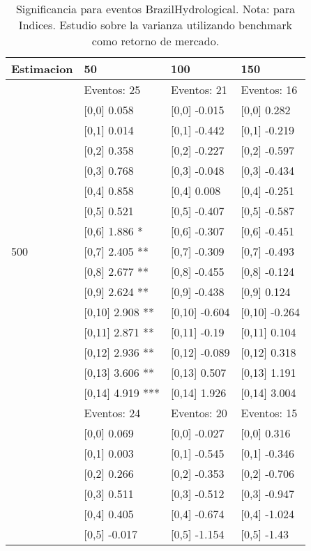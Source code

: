 \begin{table}

\caption{Significancia para eventos BrazilHydrological. Nota: para Indices. Estudio sobre la varianza utilizando benchmark como retorno de mercado.}
\centering
\begin{tabular}[t]{llll}
\toprule
Estimacion & 50 & 100 & 150\\
\midrule
 & Eventos:  25 & Eventos:  21 & Eventos:  16\\
 & {}[0,0] 0.058 & {}[0,0] -0.015 & {}[0,0] 0.282\\
 & {}[0,1] 0.014 & {}[0,1] -0.442 & {}[0,1] -0.219\\
 & {}[0,2] 0.358 & {}[0,2] -0.227 & {}[0,2] -0.597\\
 & {}[0,3] 0.768 & {}[0,3] -0.048 & {}[0,3] -0.434\\
\addlinespace
 & {}[0,4] 0.858 & {}[0,4] 0.008 & {}[0,4] -0.251\\
 & {}[0,5] 0.521 & {}[0,5] -0.407 & {}[0,5] -0.587\\
 & {}[0,6] 1.886 * & {}[0,6] -0.307 & {}[0,6] -0.451\\
500 & {}[0,7] 2.405 ** & {}[0,7] -0.309 & {}[0,7] -0.493\\
 & {}[0,8] 2.677 ** & {}[0,8] -0.455 & {}[0,8] -0.124\\
\addlinespace
 & {}[0,9] 2.624 ** & {}[0,9] -0.438 & {}[0,9] 0.124\\
 & {}[0,10] 2.908 ** & {}[0,10] -0.604 & {}[0,10] -0.264\\
 & {}[0,11] 2.871 ** & {}[0,11] -0.19 & {}[0,11] 0.104\\
 & {}[0,12] 2.936 ** & {}[0,12] -0.089 & {}[0,12] 0.318\\
 & {}[0,13] 3.606 ** & {}[0,13] 0.507 & {}[0,13] 1.191\\
\addlinespace
 & {}[0,14] 4.919 *** & {}[0,14] 1.926 & {}[0,14] 3.004\\
 & Eventos:  24 & Eventos:  20 & Eventos:  15\\
 & {}[0,0] 0.069 & {}[0,0] -0.027 & {}[0,0] 0.316\\
 & {}[0,1] 0.003 & {}[0,1] -0.545 & {}[0,1] -0.346\\
 & {}[0,2] 0.266 & {}[0,2] -0.353 & {}[0,2] -0.706\\
\addlinespace
 & {}[0,3] 0.511 & {}[0,3] -0.512 & {}[0,3] -0.947\\
 & {}[0,4] 0.405 & {}[0,4] -0.674 & {}[0,4] -1.024\\
 & {}[0,5] -0.017 & {}[0,5] -1.154 & {}[0,5] -1.43\\

\end{tabular}
\end{table}
